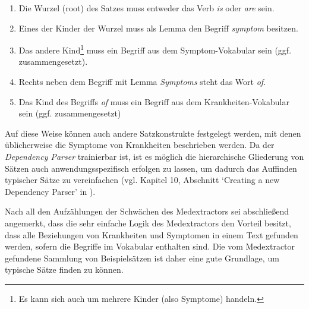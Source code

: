 \begin{enumerate}
	\item Die Wurzel (root) des Satzes muss entweder das Verb \emph{is} oder \emph{are} sein.
	\item Eines der Kinder der Wurzel muss als Lemma den Begriff \emph{symptom} besitzen.
	\item Das andere Kind\footnote{Es kann sich auch um mehrere Kinder (also Symptome) handeln.} muss ein Begriff aus dem Symptom-Vokabular sein (ggf. zusammengesetzt).
	\item Rechts neben dem Begriff mit Lemma \emph{Symptoms} steht das Wort \emph{of}.
	\item Das Kind des Begriffs \emph{of} muss ein Begriff aus dem Krankheiten-Vokabular sein (ggf. zusammengesetzt)
\end{enumerate}

Auf diese Weise können auch andere Satzkonstrukte festgelegt werden, mit denen üblicherweise die Symptome von Krankheiten beschrieben werden. Da der \emph{Dependency Parser} trainierbar ist, ist es möglich die hierarchische Gliederung von Sätzen auch anwendungsspezifisch erfolgen zu lassen, um dadurch das Auffinden typischer Sätze zu vereinfachen (vgl. Kapitel 10, Abschnitt `Creating a new Dependency Parser' in \cite{vasiliev2020natural}).

Nach all den Aufzählungen der Schwächen des Medextractors sei abschließend angemerkt, dass die sehr einfache Logik des Medextractors den Vorteil besitzt, dass alle Beziehungen von Krankheiten und Symptomen in einem Text gefunden werden, sofern die Begriffe im Vokabular enthalten sind. Die vom Medextractor gefundene Sammlung von Beispielsätzen ist daher eine gute Grundlage, um typische Sätze finden zu können.
